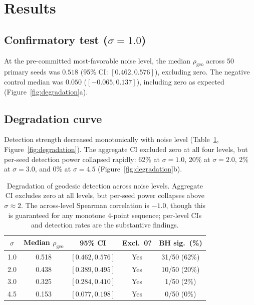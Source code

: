 \documentclass[11pt]{article}
\newcommand{\rhogeo}{\rho_\mathrm{geo}}
\begin{document}
\section{Results}
\label{sec:results}

\subsection{Confirmatory test ($\sigma = 1.0$)}

At the pre-committed most-favorable noise level, the median
$\rhogeo$ across 50 primary seeds was $0.518$ (95\% CI: $[0.462,
0.576]$), excluding zero.  The negative control median was $0.050$
($[-0.065, 0.137]$), including zero as expected
(Figure~\ref{fig:degradation}a).

\subsection{Degradation curve}

Detection strength decreased monotonically with noise level
(Table~\ref{tab:degradation}, Figure~\ref{fig:degradation}).  The
aggregate CI excluded zero at all four levels, but per-seed
detection power collapsed rapidly: 62\% at $\sigma = 1.0$, 20\%
at $\sigma = 2.0$, 2\% at $\sigma = 3.0$, and 0\% at
$\sigma = 4.5$ (Figure~\ref{fig:degradation}b).

\begin{table}[t]
\centering
\caption{Degradation of geodesic detection across noise levels.
  Aggregate CI excludes zero at all levels, but per-seed power
  collapses above $\sigma \approx 2$.  The across-level Spearman
  correlation is $-1.0$, though this is guaranteed for any
  monotone 4-point sequence; per-level CIs and detection rates
  are the substantive findings.}
\label{tab:degradation}
\begin{tabular}{@{}ccccc@{}}
\toprule
$\sigma$ & Median $\rhogeo$ & 95\% CI & Excl.\ 0? & BH sig.\ (\%) \\
\midrule
1.0 & 0.518 & $[0.462, 0.576]$ & Yes & 31/50 (62\%) \\
2.0 & 0.438 & $[0.389, 0.495]$ & Yes & 10/50 (20\%) \\
3.0 & 0.325 & $[0.284, 0.410]$ & Yes & \phantom{0}1/50 \phantom{0}(2\%) \\
4.5 & 0.153 & $[0.077, 0.198]$ & Yes & \phantom{0}0/50 \phantom{0}(0\%) \\
\bottomrule
\end{tabular}
\end{table}
\end{document}

